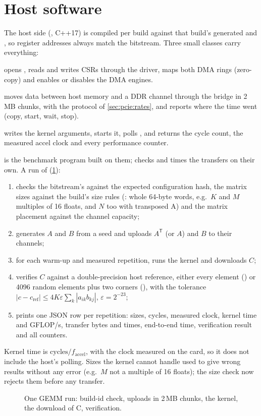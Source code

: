 \section{Host software}
\label{sec:host}

The host side (, C++17) is compiled per build against that build's generated  and
, so register addresses always match the bitstream. Three small classes carry everything:
\begin{description}[font=\sffamily\small\bfseries, leftmargin=1.2em]
  \item[\code{Card}] opens , reads and writes CSRs through the driver, maps both DMA rings
        (zero-copy) and enables or disables the DMA engines.
  \item[\code{DdrDma}] moves data between host memory and a DDR channel through the bridge in 2\,MB chunks, with the
        protocol of \cref{sec:pcie:rates}, and reports where the time went (copy, start, wait, stop).
  \item[\code{GemmKernel}] writes the kernel arguments, starts it, polls , and returns the cycle count, the
        measured accel clock and every performance counter.
\end{description}

 is the benchmark program built on them;  checks and times the transfers on
their own. A run of  (\cref{fig:sequence}):
\begin{enumerate}
  \item checks the bitstream's  against the expected configuration hash, the matrix sizes against the
        build's size rules (: whole 64-byte words, e.g.\ \(K\) and \(M\) multiples of 16 floats,
        and \(N\) too with transposed A) and the matrix placement against the channel capacity;
  \item generates \(A\) and \(B\) from a seed and uploads \(A^\mathsf{T}\) (or \(A\)) and \(B\) to their channels;
  \item for each warm-up and measured repetition, runs the kernel and downloads \(C\);
  \item verifies \(C\) against a double-precision host reference, either every element () or 4096 random
        elements plus two corners (), with the tolerance
        \(|c - c_\mathrm{ref}| \le 4K\varepsilon\sum_k|a_{ik}b_{kj}|\), \(\varepsilon = 2^{-23}\);
  \item prints one JSON row per repetition: sizes, cycles, measured clock, kernel time and GFLOP/s, transfer bytes and
        times, end-to-end time, verification result and all counters.
\end{enumerate}
Kernel time is \(\text{cycles}/f_\text{accel}\), with the clock measured on the card, so it does not include the
host's polling. Sizes the kernel cannot handle used to give wrong results without any error (e.g.\ \(M\) not a
multiple of 16 floats); the size check now rejects them before any transfer.

\begin{figure}[t]
  \centering
  \resizebox{\linewidth}{!}{}
  \caption{One GEMM run: build-id check, uploads in 2\,MB chunks, the kernel, the download of C, verification.}
  \label{fig:sequence}
\end{figure}
